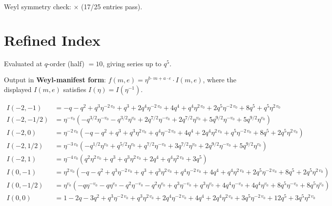 \documentclass[11pt,a4paper]{article}
\begin{document}
Weyl symmetry check: $\times$ (17/25 entries pass).

\section{Refined Index}
Evaluated at $q$-order (half) $= 10$, giving series up to $q^{5}$.

Output in \textbf{Weyl-manifest form}: $f(m,e) = \eta^{b\cdot m + a\cdot e}\cdot I(m,e)$, where the displayed $I(m,e)$ satisfies $I(\eta) = I(\eta^{-1})$.

\begin{align*}
I(-2, -1) &= -q - q^{2} + q^{3} \eta^{-2 \, v_{0}} + q^{3} + 2 q^{4} \eta^{-2 \, v_{0}} + 4 q^{4} + q^{4} \eta^{2 \, v_{0}} + 2 q^{5} \eta^{-2 \, v_{0}} + 8 q^{5} + q^{5} \eta^{2 \, v_{0}} \\
I(-2, -1/2) &= \eta^{-v_{0}} \left( -q^{3/2} \eta^{-v_{0}} - q^{3/2} \eta^{v_{0}} + 2 q^{7/2} \eta^{-v_{0}} + 2 q^{7/2} \eta^{v_{0}} + 5 q^{9/2} \eta^{-v_{0}} + 5 q^{9/2} \eta^{v_{0}} \right) \\
I(-2, 0) &= \eta^{-2 \, v_{0}} \left( -q - q^{2} + q^{3} + q^{3} \eta^{2 \, v_{0}} + q^{4} \eta^{-2 \, v_{0}} + 4 q^{4} + 2 q^{4} \eta^{2 \, v_{0}} + q^{5} \eta^{-2 \, v_{0}} + 8 q^{5} + 2 q^{5} \eta^{2 \, v_{0}} \right) \\
I(-2, 1/2) &= \eta^{-3 \, v_{0}} \left( -q^{1/2} \eta^{v_{0}} + q^{5/2} \eta^{v_{0}} + q^{7/2} \eta^{-v_{0}} + 3 q^{7/2} \eta^{v_{0}} + 2 q^{9/2} \eta^{-v_{0}} + 5 q^{9/2} \eta^{v_{0}} \right) \\
I(-2, 1) &= \eta^{-4 \, v_{0}} \left( q^{2} \eta^{2 \, v_{0}} + q^{3} + q^{3} \eta^{2 \, v_{0}} + 2 q^{4} + q^{4} \eta^{2 \, v_{0}} + 3 q^{5} \right) \\
I(0, -1) &= \eta^{2 \, v_{0}} \left( -q - q^{2} + q^{3} \eta^{-2 \, v_{0}} + q^{3} + q^{3} \eta^{2 \, v_{0}} + q^{4} \eta^{-2 \, v_{0}} + 4 q^{4} + q^{4} \eta^{2 \, v_{0}} + 2 q^{5} \eta^{-2 \, v_{0}} + 8 q^{5} + 2 q^{5} \eta^{2 \, v_{0}} \right) \\
I(0, -1/2) &= \eta^{v_{0}} \left( -q \eta^{-v_{0}} - q \eta^{v_{0}} - q^{2} \eta^{-v_{0}} - q^{2} \eta^{v_{0}} + q^{3} \eta^{-v_{0}} + q^{3} \eta^{v_{0}} + 4 q^{4} \eta^{-v_{0}} + 4 q^{4} \eta^{v_{0}} + 8 q^{5} \eta^{-v_{0}} + 8 q^{5} \eta^{v_{0}} \right) \\
I(0, 0) &= 1 - 2 q - 3 q^{2} + q^{3} \eta^{-2 \, v_{0}} + q^{3} \eta^{2 \, v_{0}} + 2 q^{4} \eta^{-2 \, v_{0}} + 4 q^{4} + 2 q^{4} \eta^{2 \, v_{0}} + 3 q^{5} \eta^{-2 \, v_{0}} + 12 q^{5} + 3 q^{5} \eta^{2 \, v_{0}} \\

\end{align*}
\end{document}

